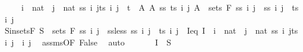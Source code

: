 \begin{isabellebody}
\ {\isasymSS}\ \ {\isachardoublequoteopen}{\isasymSS}\ {\isacharequal}{\kern0pt}\ {\isacharbraceleft}{\kern0pt}{\isacharparenleft}{\kern0pt}{\isasymUnion}i\ {\isacharcolon}{\kern0pt}{\isacharcolon}{\kern0pt}\ nat{\isachardot}{\kern0pt}\ {\isasymInter}\ j\ {\isacharcolon}{\kern0pt}{\isacharcolon}{\kern0pt}\ nat{\isachardot}{\kern0pt}\ {\isacharbraceleft}{\kern0pt}ss\ i\ j{\isacharless}{\kern0pt}{\isachardot}{\kern0pt}{\isachardot}{\kern0pt}ts\ i\ j\ {\isacharcolon}{\kern0pt}{\isacharcolon}{\kern0pt}\ {\isacharprime}{\kern0pt}t{\isacharbraceright}{\kern0pt}{\isacharparenright}{\kern0pt}\ {\isasymtimes}\ A\ {\isacharbar}{\kern0pt}A\ ss\ ts{\isachardot}{\kern0pt}\ {\isasymforall}i\ j{\isachardot}{\kern0pt}\ A\ {\isasymin}\ sets\ {\isacharparenleft}{\kern0pt}F\ {\isacharparenleft}{\kern0pt}ss\ i\ j{\isacharparenright}{\kern0pt}{\isacharparenright}{\kern0pt}\ {\isasymand}\ ss\ i\ j\ {\isacharless}{\kern0pt}\ ts\ i\ j{\isacharbraceright}{\kern0pt}{\isachardoublequoteclose}\isanewline
\ \ \ \ \isamarkupfalse%
\ S{\isacharunderscore}{\kern0pt}in{\isacharunderscore}{\kern0pt}sets{\isacharunderscore}{\kern0pt}F{\isacharcolon}{\kern0pt}\ {\isachardoublequoteopen}S\ {\isasymin}\ sets\ {\isacharparenleft}{\kern0pt}F\ {\isacharparenleft}{\kern0pt}ss\ i\ j{\isacharparenright}{\kern0pt}{\isacharparenright}{\kern0pt}{\isachardoublequoteclose}\ \ ss{\isacharunderscore}{\kern0pt}less{\isacharcolon}{\kern0pt}\ {\isachardoublequoteopen}ss\ i\ j\ {\isacharless}{\kern0pt}\ ts\ i\ j{\isachardoublequoteclose}\ \ I{\isacharunderscore}{\kern0pt}eq{\isacharcolon}{\kern0pt}\ {\isachardoublequoteopen}I\ {\isacharequal}{\kern0pt}\ {\isacharparenleft}{\kern0pt}{\isasymUnion}i\ {\isacharcolon}{\kern0pt}{\isacharcolon}{\kern0pt}\ nat{\isachardot}{\kern0pt}\ {\isasymInter}\ j\ {\isacharcolon}{\kern0pt}{\isacharcolon}{\kern0pt}\ nat{\isachardot}{\kern0pt}\ {\isacharbraceleft}{\kern0pt}ss\ i\ j{\isacharless}{\kern0pt}{\isachardot}{\kern0pt}{\isachardot}{\kern0pt}ts\ i\ j{\isacharbraceright}{\kern0pt}{\isacharparenright}{\kern0pt}{\isachardoublequoteclose}\ \ i\ j\ \isamarkupfalse%
\ assms{\isacharparenleft}{\kern0pt}{}{\isacharparenright}{\kern0pt}{\isacharbrackleft}{\kern0pt}OF\ False{\isacharbrackright}{\kern0pt}\ \isamarkupfalse%
\ auto\isanewline
\ \ \ \ \isamarkupfalse%
\ {\isacharasterisk}{\kern0pt}{\isacharasterisk}{\kern0pt}{\isacharcolon}{\kern0pt}\ {\isachardoublequoteopen}I\ {\isasymtimes}\ S\ {\isasymin}\ {\isasymSS}{\isachardoublequoteclose}\ \isamarkupfalse%

\end{isabellebody}
